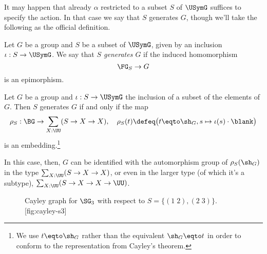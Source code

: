 It may happen that already $\alpha$ restricted to a subset $S$ of $\USymG$
suffices to specify the action.
In that case we say that $S$ generates $G$, though we'll take the following
as the official definition.
\begin{definition}\label{def:gens-gp}
  Let $G$ be a group and $S$ be a subset of $\USymG$, given by an inclusion
  $\iota : S \to \USymG$. We say that \emph{$S$ generates $G$} if the induced
  homomorphism
  \[
    \FG_S \to G
  \]
  is an epimorphism.
\end{definition}
\begin{lemma}\label{lem:gens-gp-iff}
  Let $G$ be a group and $\iota : S \to \USymG$ the inclusion of a subset of the elements of $G$.
  Then $S$ generates $G$ if and only if the map
  \[
    \rho_S : \BG \to \sum_{X:\UU}(S \to X \to X) ,
    \quad
    \rho_S(t) \defeq \bigl(t \eqto \sh_G, s \mapsto \iota(s) \cdot \blank\bigr)
  \]
  is an embedding.\footnote{We use $t \eqto \sh_G$ rather than the equivalent
    $\sh_G \eqto t$ in order to conform to the representation from Cayley's theorem.}
\end{lemma}
In this case, then, $G$ can be identified with the automorphism group of $\rho_S(\sh_G)$
in the type $\sum_{X:\UU}(S \to X \to X)$, or even in the larger type (of which it's a subtype), $\sum_{X:\UU}(S \to X \to X \to \UU)$.



\begin{figure}
  \begin{sidecaption}%
    {Cayley graph for {$\protect\SG_3$} with respect to $S = \{(1\;2),(2\;3)\}$.}[fig:cayley-s3]
  \centering
  \end{sidecaption}
\end{figure}

